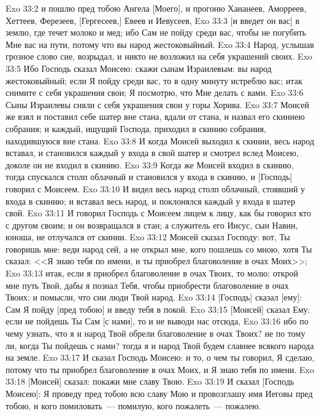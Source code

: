 \vs Exo 33:2 и пошлю пред тобою Ангела [Моего], и прогоню Хананеев, Аморреев, Хеттеев, Ферезеев, [Гергесеев,] Евеев и Иевусеев,
\vs Exo 33:3 [и введет он вас] в землю, где течет молоко и мед; ибо Сам не пойду среди вас, чтобы не погубить Мне вас на пути, потому что вы народ жестоковыйный.
\vs Exo 33:4 Народ, услышав грозное слово сие, возрыдал, и никто не возложил на себя украшений своих.
\vs Exo 33:5 Ибо Господь сказал Моисею: скажи сынам Израилевым: вы народ жестоковыйный; если Я пойду среди вас, то в одну минуту истреблю вас; итак снимите с себя украшения свои; Я посмотрю, что Мне делать с вами.
\vs Exo 33:6 Сыны Израилевы сняли с себя украшения свои у горы Хорива.
\rsbpar\vs Exo 33:7 Моисей же взял и поставил себе шатер вне стана, вдали от стана, и назвал его скиниею собрания; и каждый, ищущий Господа, приходил в скинию собрания, находившуюся вне стана.
\vs Exo 33:8 И когда Моисей выходил к скинии, весь народ вставал, и становился каждый у входа в свой шатер и смотрел вслед Моисею, доколе он не входил в скинию.
\vs Exo 33:9 Когда же Моисей входил в скинию, тогда спускался столп облачный и становился у входа в скинию, и [Господь] говорил с Моисеем.
\vs Exo 33:10 И видел весь народ столп облачный, стоявший у входа в скинию; и вставал весь народ, и поклонялся каждый у входа в шатер свой.
\vs Exo 33:11 И говорил Господь с Моисеем лицем к лицу, как бы говорил кто с другом своим; и он возвращался в стан; а служитель его Иисус, сын Навин, юноша, не отлучался от скинии.
\rsbpar\vs Exo 33:12 Моисей сказал Господу: вот, Ты говоришь мне: веди народ сей, а не открыл мне, кого пошлешь со мною, хотя Ты сказал: <<Я знаю тебя по имени, и ты приобрел благоволение в очах Моих>>;
\vs Exo 33:13 итак, если я приобрел благоволение в очах Твоих, то молю: открой мне путь Твой, дабы я познал Тебя, чтобы приобрести благоволение в очах Твоих; и помысли, что сии люди Твой народ.
\vs Exo 33:14 [Господь] сказал [ему]: Сам Я пойду [пред тобою] и введу тебя в покой.
\vs Exo 33:15 [Моисей] сказал Ему: если не пойдешь Ты Сам [с нами], то и не выводи нас отсюда,
\vs Exo 33:16 ибо по чему узнать, что я и народ Твой обрели благоволение в очах Твоих? не по тому ли, когда Ты пойдешь с нами? тогда я и народ Твой будем славнее всякого народа на земле.
\vs Exo 33:17 И сказал Господь Моисею: и то, о чем ты говорил, Я сделаю, потому что ты приобрел благоволение в очах Моих, и Я знаю тебя по имени.
\vs Exo 33:18 [Моисей] сказал: покажи мне славу Твою.
\vs Exo 33:19 И сказал [Господь Моисею]: Я проведу пред тобою всю славу Мою и провозглашу имя Иеговы пред тобою, и кого помиловать~--- помилую, кого пожалеть~--- пожалею.
